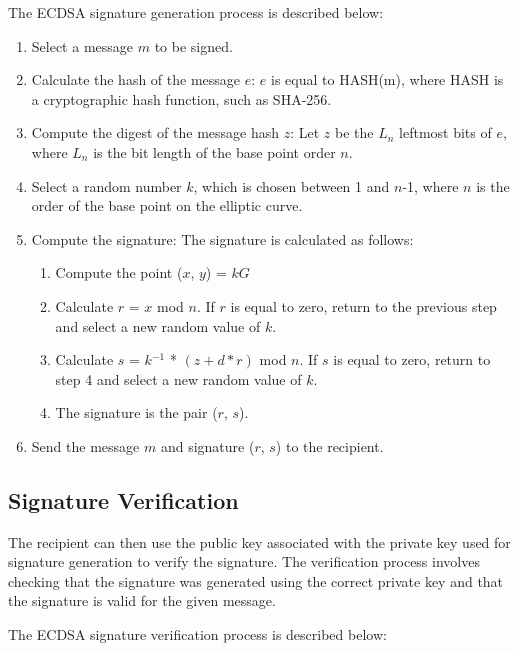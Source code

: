 \documentclass[main\_\_EN.tex]{subfiles}
\begin{document}
The ECDSA signature generation process is described below:

\begin{enumerate}
    \item Select a message $m$ to be signed.
    \item Calculate the hash of the message $e$: $e$ is equal to HASH(m), where HASH is a cryptographic hash function, such as SHA-256.
    \item Compute the digest of the message hash $z$: Let $z$ be the $L_n$ leftmost bits of $e$, where $L_n$ is the bit length of the base point order $n$.
    \item Select a random number $k$, which is chosen between 1 and $n$-1, where $n$ is the order of the base point on the elliptic curve.
    \item Compute the signature: The signature is calculated as follows:
          \begin{enumerate}
              \item Compute the point ($x$, $y$) = $kG$
              \item Calculate $r$ = $x$ mod $n$. If $r$ is equal to zero, return to the previous step and select a new random value of $k$.
              \item Calculate $s$ = $k$$^{-1}$ * $(z + d*r)$  \textrm{mod} $n$. If $s$ is equal to zero, return to step 4 and select a new random value of $k$.
              \item The signature is the pair ($r$, $s$).
          \end{enumerate}
    \item Send the message $m$ and signature ($r$, $s$) to the recipient.
\end{enumerate}

\subsection{Signature Verification}

The recipient can then use the public key associated with the private key used for signature generation to verify the signature. The verification process involves checking that the signature was generated using the correct private key and that the signature is valid for the given message.

The ECDSA signature verification process is described below:
\end{document}
